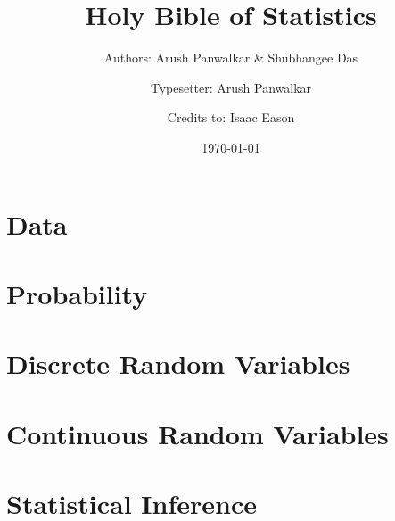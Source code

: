 \documentclass[11pt]{book}
\title{Holy Bible of Statistics}
\author{
  Authors: Arush Panwalkar \& Shubhangee Das\\
  \and
  Typesetter: Arush Panwalkar\\
  \and
  Credits to: Isaac Eason
}
\date{\today}
\begin{document}
\maketitle
\newtheorem{theorem}{Theorem}[section]
\newtheorem{lemma}{Lemma}[theorem]
\newtheorem{corollary}{Corollary}[theorem]
\newtheorem{definition}{Definition}
\theoremstyle{definition}
\newtheorem*{example}{Example}
\newtheorem*{proposition}{Proposition}
\theoremstyle{remark}
\newtheorem*{claim}{Claim}
\theoremstyle{remark}
\newtheorem*{remark}{Remark}
\theoremstyle{definition}
\newtheorem*{exercise}{Exercise}
\tableofcontents

\chapter{Data}


\chapter{Probability}


\chapter{Discrete Random Variables}


\chapter{Continuous Random Variables}


\chapter{Statistical Inference}

\end{document}
